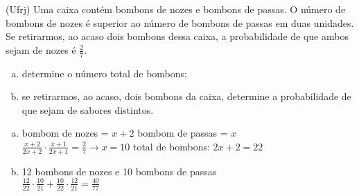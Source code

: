 \begin{ex}
 (Ufrj) Uma caixa contém bombons de nozes e bombons de passas. O número de bombons de nozes é superior ao número de bombons de passas em duas unidades. Se retirarmos, ao acaso dois bombons dessa caixa, a probabilidade de que ambos sejam de nozes é $\frac{2}{7}$.
   \begin{enumerate}[(a)]
   \item determine o número total de bombons;
   \item se retirarmos, ao acaso, dois bombons da caixa, determine a probabilidade de que sejam de sabores distintos. 
   \end{enumerate}
      \begin{sol}
       \phantom{A}
       \begin{enumerate} [(a)]
           \item bombom de nozes = $x+2$\hspace{0,4cm} bombom de passas = $x$\\
          $\frac{x+2}{2x+2}\cdot\frac{x+1}{2x+1}=\frac{2}{7} \rightarrow x=10$ \hspace{0,4cm}
          total de bombons: $2x+2= 22$
          \item 12 bombons de nozes e 10 bombons de passas \\
          $\frac{12}{22}\cdot\frac{10}{21}+\frac{10}{22}\cdot\frac{12}{21}=\frac{40}{77}$
           
       \end{enumerate}
      \end{sol}
\end{ex}
